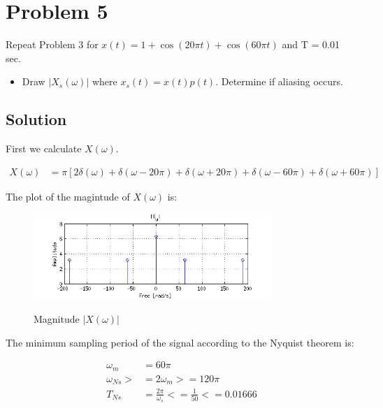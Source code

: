 \section*{Problem 5}

Repeat Problem 3 for $x(t) = 1 + \cos(20 \pi t) + \cos(60 \pi t)$ and T = 0.01 sec.

\begin{itemize}
\item  Draw $|X_s(\omega)|$ where $x_s(t) = x(t)p(t)$. Determine if aliasing occurs.
\end{itemize} 

\subsection*{Solution}

First we calculate $X(\omega)$.

\begin{equation*}
\begin{aligned}
X(\omega) &= \pi [ 2 \delta(\omega) + 
	\delta(\omega - 20\pi) + \delta(\omega + 20 \pi) +
	\delta(\omega - 60\pi) + \delta(\omega + 60 \pi)]
\end{aligned}
\end{equation*} 

The plot of the magintude of $X(\omega)$ is:

\begin{figure}[H]
\caption{Magnitude $|X(\omega)|$}
\centering
\includegraphics[width=0.8\textwidth]{figs/c3p5a1.png}
\label{fig:c3p5a1}
\end{figure} 

The minimum sampling period of the signal according to the Nyquist theorem is:

\begin{equation*}
\begin{aligned}
\omega_m &= 60 \pi \\
\omega_{Ns} >&= 2 \omega_m >= 120 \pi \\
T_{Ns} &= \frac{2 \pi}{\omega_s} <= \frac{1}{50} <= 0.01666
\end{aligned}
\end{equation*} 

